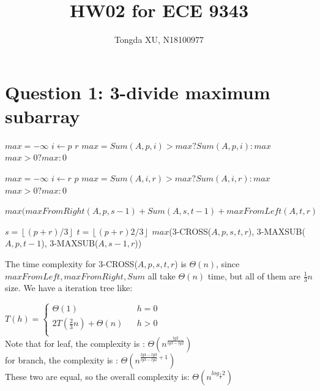 \documentclass[]{article}
\title{HW02 for ECE 9343}
\author{Tongda XU, N18100977}
\begin{document}
\maketitle

\section{Question 1: 3-divide maximum subarray}

\begin{codebox}
	\li $max = -\infty$
	\li \For $i \gets p$ \To $r$
	\li		\Do $max = Sum(A,p,i)>max?Sum(A,p,i):max$
 		\End
	\li \Return $max > 0 ? max : 0$
\end{codebox}

\begin{codebox}
	\li $max = -\infty$
	\li \For $i \gets r$ \Downto $p$
	\li		\Do $max = Sum(A,i,r)>max?Sum(A,i,r):max$
	\End
	\li \Return $max > 0 ? max : 0$
\end{codebox}

\begin{codebox}

	\li \Return $max(maxFromRight(A, p, s-1) +  Sum(A,s,t-1) + maxFromLeft(A, t, r)$
\end{codebox}

\begin{codebox}
	\li $s = \left \lfloor (p+r)/3 \right \rfloor$
	\li $t = \left \lfloor (p+r)2/3 \right \rfloor$
	\li \Return $max$(3-CROSS($A, p, s, t, r$), 3-MAXSUB($A, p, t-1$), 3-MAXSUB($A, s-1, r$))
\end{codebox}

The time complexity for 3-CROSS($A, p, s, t, r$) is $\Theta(n)$, since $maxFromLeft, maxFromRight, Sum$ all take $\Theta(n)$ time, but all of them are $\frac{1}{3}n$ size. We have a iteration tree like: 

$ T(h)=\left\{
\begin{array}{lcl}
\Theta(1)       &      & {h = 0}\\
2T(\frac{2}{3}n) + \Theta(n)     &      & {h > 0}\\
\end{array} \right. $\\

Note that for leaf, the complexity is : $\Theta(n^{\frac{lg2}{lg3-lg2}})$\\
for branch, the complexity is : $\Theta(n^{\frac{lg4-lg3}{lg3-lg2}+1})$\\
These two are equal, so the overall complexity is: $\Theta(n^{log_{\frac{3}{2}}2 })$
\end{document}
